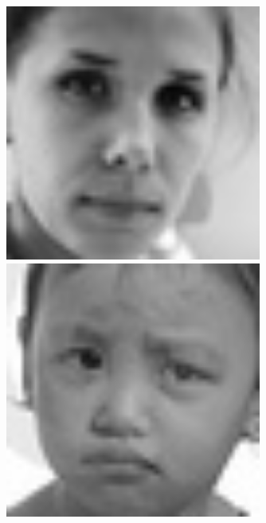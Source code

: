 \begin{frame}
\begin{figure}[!ht]
\begin{minipage}[t]{0.20\textwidth}
    \centering
      \includegraphics[width=0.75\textwidth]{images/fer2013/neutral.jpg}
    \end{minipage}
    \hfill
    \begin{minipage}[t]{0.20\textwidth}
    \centering
      \includegraphics[width=0.75\textwidth]{images/fer2013/sad.jpg}
    \end{minipage}
    \hfill
    \begin{minipage}[t]{0.20\textwidth}
    \centering

\end{minipage}
\end{figure}
\end{frame}
